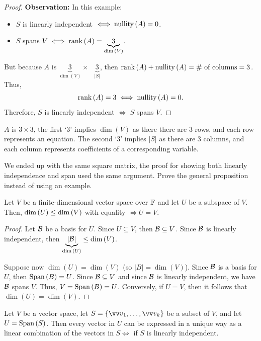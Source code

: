 \begin{proof}
    \textbf{Observation:} In this example:
    \begin{itemize}
        \item $S$ is linearly independent $\iff \operatorname{nullity}{(A)} = 0$.
        \item $S$ spans $V \iff \operatorname{rank}{(A)} = \underbrace{3}_{\dim{(V)}} $.
    \end{itemize}
    But because $A$ is $\underbrace{3}_{\dim{(V)}} \times \phantom{A} \underbrace{3}_{|S|} $, then $\operatorname{rank}{(A)} + \operatorname{nullity}{(A)} = \text{\# of columns} = 3$. Thus,
    \[\operatorname{rank}{(A)} = 3 \iff \operatorname{nullity}{(A)} = 0.\]
    Therefore, $S$ is linearly independent $\iff$ $S$ spans $V$.
\end{proof}

\begin{note}
    $A$ is $3 \times 3$, the first `3' implies $\dim{(V)}$ as there there are 3 rows, and each row represents an equation.
    The second `3' implies $|S|$ as there are 3 columns, and each column represents coefficients of a corresponding variable.
\end{note}

\begin{remark}[Exercise]
    We ended up with the same square matrix, the proof for showing both linearly independence and span used the same argument. Prove the general proposition instead of using an example.
\end{remark}

\begin{theorem}
    Let $V$ be a finite-dimensional vector space over ${\mathbb{F}}$ and let $U$ be a subspace of $V$.
    Then, $\operatorname{dim}{(U)} \leq \operatorname{dim}{(V)}$ with equality $\iff U = V$.
\end{theorem}

\begin{proof}
    Let $\mathcal{B}$ be a basis for $U$. Since $U \subseteq V$, then $\mathcal{B} \subseteq V$. Since $\mathcal{B}$ is linearly independent, then $\underbrace{|\mathcal{B}|}_{\dim{(U)}}  \leq \dim{(V)}$.

    Suppose now $\dim{(U)} = \dim{(V)}$ (so $|B| = \dim{(V)}$). Since $\mathcal{B}$ is a basis for $U$, then $\operatorname{Span}{(B)} = U$. Since $\mathcal{B} \subseteq V$ and since $\mathcal{B}$ is linearly independent,
    we have $\mathcal{B}$ spans $V$. Thus, $V = \operatorname{Span}{(B)} = U$. Conversely, if $U = V$, then it follows that $\dim{(U)} = \dim{(V)}$.
\end{proof}

\begin{lemma}
    Let $V$ be a vector space, let $S = \left\{  \vvv_1,\ldots,\vvv_k \right\}$ be a subset of $V$, and let $U = \operatorname{Span}{(S)}$.
    Then every vector in $U$ can be expressed in a unique way as a linear combination of the vectors in $S \iff$ if $S$ is linearly independent.
\end{lemma}

